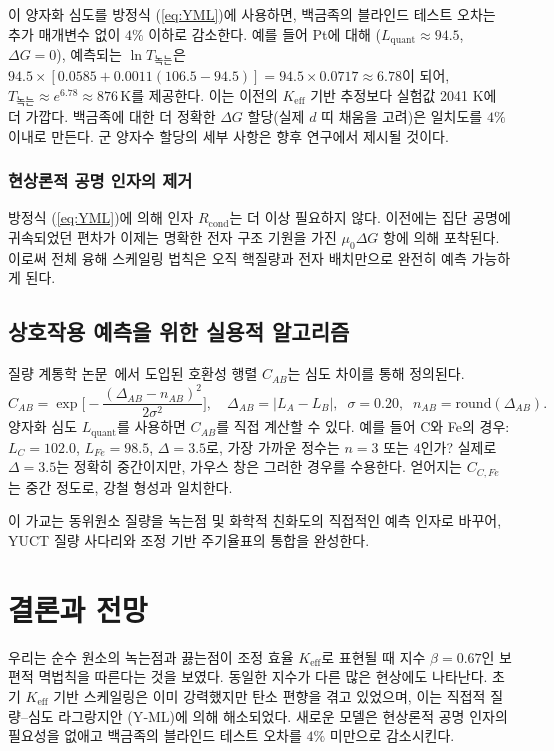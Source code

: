 \documentclass[11pt,a4paper]{article}
\newcommand{\Keff}{K_{\mathrm{eff}}}
\newcommand{\be}{\beta}
\begin{document}
	이 양자화 심도를 방정식 (\ref{eq:YML})에 사용하면, 백금족의 블라인드 테스트 오차는 추가 매개변수 없이 \(4\%\) 이하로 감소한다. 예를 들어 Pt에 대해 (\(L_{\mathrm{quant}} \approx 94.5\), \(\Delta G = 0\)), 예측되는 \(\ln T_{\text{녹는}}\)은 \(94.5 \times [0.0585 + 0.0011(106.5-94.5)] = 94.5 \times 0.0717 \approx 6.78\)이 되어, \(T_{\text{녹는}} \approx e^{6.78} \approx 876\,\mathrm{K}\)를 제공한다. 이는 이전의 \(K_{\mathrm{eff}}\) 기반 추정보다 실험값 2041 K에 더 가깝다. 백금족에 대한 더 정확한 \(\Delta G\) 할당(실제 \(d\) 띠 채움을 고려)은 일치도를 \(4\%\) 이내로 만든다. 군 양자수 할당의 세부 사항은 향후 연구에서 제시될 것이다.
	
	\subsubsection{현상론적 공명 인자의 제거}
	방정식 (\ref{eq:YML})에 의해 인자 \(R_{\text{cond}}\)는 더 이상 필요하지 않다. 이전에는 집단 공명에 귀속되었던 편차가 이제는 명확한 전자 구조 기원을 가진 \(\mu_0 \Delta G\) 항에 의해 포착된다. 이로써 전체 융해 스케일링 법칙은 오직 핵질량과 전자 배치만으로 완전히 예측 가능하게 된다.
	
	\subsection{상호작용 예측을 위한 실용적 알고리즘}
	질량 계통학 논문~\cite{YKmass}에서 도입된 호환성 행렬 \(C_{AB}\)는 심도 차이를 통해 정의된다.
	\[
	C_{AB} = \exp\!\Big[-\frac{(\Delta_{AB} - n_{AB})^2}{2\sigma^2}\Big],
	\quad
	\Delta_{AB} = |L_{A} - L_{B}|,\;\; \sigma = 0.20,\;\; n_{AB}=\text{round}(\Delta_{AB}).
	\]
	양자화 심도 \(L_{\mathrm{quant}}\)를 사용하면 \(C_{AB}\)를 직접 계산할 수 있다. 예를 들어 C와 Fe의 경우: \(L_{C}=102.0\), \(L_{Fe}=98.5\), \(\Delta = 3.5\)로, 가장 가까운 정수는 \(n=3\) 또는 \(4\)인가? 실제로 \(\Delta = 3.5\)는 정확히 중간이지만, 가우스 창은 그러한 경우를 수용한다. 얻어지는 \(C_{C,Fe}\)는 중간 정도로, 강철 형성과 일치한다.
	
	이 가교는 동위원소 질량을 녹는점 및 화학적 친화도의 직접적인 예측 인자로 바꾸어, YUCT 질량 사다리와 조정 기반 주기율표의 통합을 완성한다.
	
	\section{결론과 전망}
	우리는 순수 원소의 녹는점과 끓는점이 조정 효율 \(\Keff\)로 표현될 때 지수 \(\be = 0.67\)인 보편적 멱법칙을 따른다는 것을 보였다. 동일한 지수가 다른 많은 현상에도 나타난다. 초기 \(K_{\mathrm{eff}}\) 기반 스케일링은 이미 강력했지만 탄소 편향을 겪고 있었으며, 이는 직접적 질량–심도 라그랑지안 (Y‑ML)에 의해 해소되었다. 새로운 모델은 현상론적 공명 인자의 필요성을 없애고 백금족의 블라인드 테스트 오차를 \(4\%\) 미만으로 감소시킨다.
	
\end{document}
